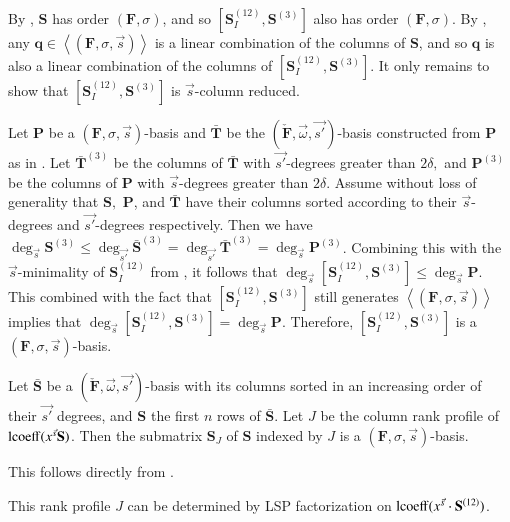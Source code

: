 \begin{pf}
By , $\mathbf{S}$ has order $\left(\mathbf{F},\sigma\right)$,
and so $[\mathbf{S}_{I}^{\left(12\right)},\mathbf{S}^{\left(3\right)}]$
also has order $\left(\mathbf{F},\sigma\right)$. By ,
any $\mathbf{q}\in\left\langle \left(\mathbf{F},\sigma,\vec{s}\right)\right\rangle $
is a linear combination of the columns of $\mathbf{S}$, and so $\mathbf{q}$
is also a linear combination of the columns of $[\mathbf{S}_{I}^{\left(12\right)},\mathbf{S}^{\left(3\right)}]$.
It only remains to show that $[\mathbf{S}_{I}^{\left(12\right)},\mathbf{S}^{\left(3\right)}]$
is $\vec{s}$-column reduced.

Let $\mathbf{P}$ be a $\left(\mathbf{F},\sigma,\vec{s}\right)$-basis
and $\mathbf{\bar{\mathbf{T}}}$ be the $(\check{\mathbf{F}},\vec{\omega},\vec{s'})$-basis
constructed from $\mathbf{P}$ as in . Let
$\bar{\mathbf{T}}^{\left(3\right)}$ be the columns of $\bar{\mathbf{T}}$
with $\vec{s'}$-degrees greater than $2\delta,$ and $\mathbf{P}^{\left(3\right)}$
be the columns of $\mathbf{P}$ with $\vec{s}$-degrees greater than
$2\delta.$ Assume without loss of generality that $\mathbf{S},$
$\mathbf{P}$, and $\bar{\mathbf{T}}$ have their columns sorted according
to their $\vec{s}$-degrees and $\vec{s'}$-degrees respectively.
Then we have $\deg_{\vec{s}}\mathbf{S}^{\left(3\right)}\le\deg_{\vec{s'}}\bar{\mathbf{S}}^{\left(3\right)}=\deg_{\vec{s'}}\bar{\mathbf{T}}^{\left(3\right)}=\deg_{\vec{s}}\mathbf{P}^{\left(3\right)}$.
Combining this with the $\vec{s}$-minimality of $\mathbf{S}_{I}^{\left(12\right)}$
from , it follows that $\deg_{\vec{s}}[\mathbf{S}_{I}^{\left(12\right)},\mathbf{S}^{\left(3\right)}]\le\deg_{\vec{s}}\mathbf{P}$.
This combined with the fact that $[\mathbf{S}_{I}^{\left(12\right)},\mathbf{S}^{\left(3\right)}]$
still generates $\left\langle \left(\mathbf{F},\sigma,\vec{s}\right)\right\rangle $
implies that $\deg_{\vec{s}}[\mathbf{S}_{I}^{\left(12\right)},\mathbf{S}^{\left(3\right)}]=\deg_{\vec{s}}\mathbf{P}$.
Therefore, $[\mathbf{S}_{I}^{\left(12\right)},\mathbf{S}^{\left(3\right)}]$
is a $\left(\mathbf{F},\sigma,\vec{s}\right)$-basis. \end{pf}
\begin{cor}
\label{cor:extractingFbasisFromGbasis}Let $\bar{\mathbf{S}}$ be
a $(\check{\mathbf{F}},\vec{\omega},\vec{s'})$-basis with its columns
sorted in an increasing order of their $\vec{s'}$ degrees, and $\mathbf{S}$
the first $n$ rows of $\bar{\mathbf{S}}$. Let $J$ be the column
rank profile of $\operatorname{lcoeff}(x^{\vec{s}}\mathbf{S})$. Then the submatrix
$\mathbf{S}_{J}$ of $\mathbf{S}$ indexed by $J$ is a $\left(\mathbf{F},\sigma,\vec{s}\right)$-basis.\end{cor}
\begin{pf}
This follows directly from . 
\end{pf}
This rank profile $J$ can be determined by LSP factorization on $\operatorname{lcoeff}(x^{\vec{s}}\cdot\mathbf{S}^{\left(12\right)})$.


